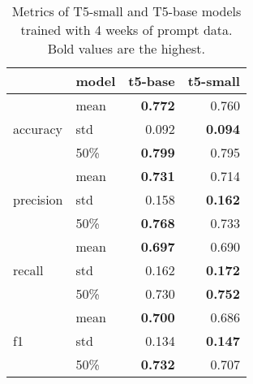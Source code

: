 \begin{table}
\caption{Metrics of T5-small and T5-base models trained with 4 weeks of prompt data. Bold values are the highest.}
\label{tab:small_v_base}
\begin{tabular}{llrr}
\toprule
 & model & t5-base & t5-small \\
\midrule
\multirow[c]{3}{*}{accuracy} & mean & \textbf{0.772} & 0.760 \\
 & std & 0.092 & \textbf{0.094} \\
 & 50\% & \textbf{0.799} & 0.795 \\
\cline{1-4}
\multirow[c]{3}{*}{precision} & mean & \textbf{0.731} & 0.714 \\
 & std & 0.158 & \textbf{0.162} \\
 & 50\% & \textbf{0.768} & 0.733 \\
\cline{1-4}
\multirow[c]{3}{*}{recall} & mean & \textbf{0.697} & 0.690 \\
 & std & 0.162 & \textbf{0.172} \\
 & 50\% & 0.730 & \textbf{0.752} \\
\cline{1-4}
\multirow[c]{3}{*}{f1} & mean & \textbf{0.700} & 0.686 \\
 & std & 0.134 & \textbf{0.147} \\
 & 50\% & \textbf{0.732} & 0.707 \\
\cline{1-4}
\bottomrule
\end{tabular}
\end{table}
